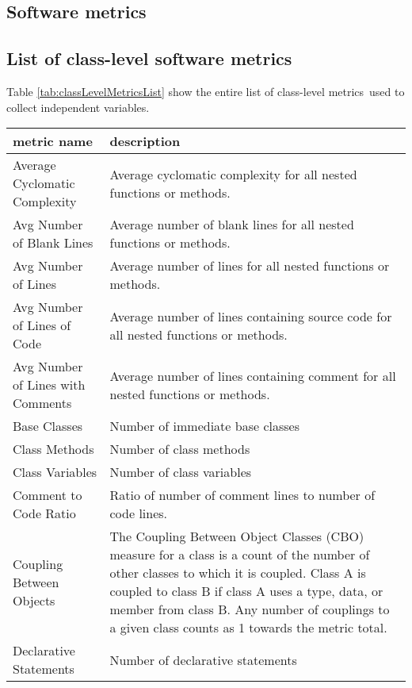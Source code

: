 \begin{apendicesenv}

    \chapter{Software metrics}
    \label{appe:A}
    
    \section{List of class-level software metrics}
    
    Table \ref{tab:classLevelMetricsList} show the entire list of class-level metrics\footnotemark ~used to collect independent variables.
    
\begin{center}
\footnotesize
\begin{longtabu} to 
\toprule
\textbf{metric name} & \textbf{description} \\ 
\midrule
\endhead
Average Cyclomatic Complexity & Average cyclomatic complexity for all nested functions or methods. \\
Avg Number of Blank Lines & Average number of blank lines for all nested functions or methods. \\
Avg Number of Lines & Average number of lines for all nested functions or methods. \\
Avg Number of Lines of Code & Average number of lines containing source code for all nested functions or methods. \\
Avg Number of Lines with Comments & Average number of lines containing comment for all nested functions or methods. \\
Base Classes & Number of immediate base classes \\
Class Methods & Number of class methods \\
Class Variables & Number of class variables \\
Comment to Code Ratio & Ratio of number of comment lines to number of code lines. \\
Coupling Between Objects & The Coupling Between Object Classes (CBO) measure for a class is a count of the number of other classes to which it is coupled. Class A is coupled to class B if class A uses a type, data, or member from class B. Any number of couplings to a given class counts as 1 towards the metric total. \\
Declarative Statements & Number of declarative statements \\

\end{longtabu}
\end{center}
\end{apendicesenv}
